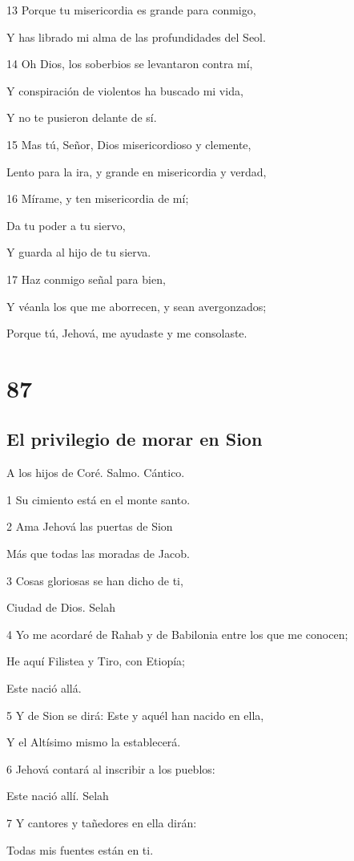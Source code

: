 \par 13 Porque tu misericordia es grande para conmigo,
\par Y has librado mi alma de las profundidades del Seol.
\par 14 Oh Dios, los soberbios se levantaron contra mí,
\par Y conspiración de violentos ha buscado mi vida,
\par Y no te pusieron delante de sí.
\par 15 Mas tú, Señor, Dios misericordioso y clemente,
\par Lento para la ira, y grande en misericordia y verdad,
\par 16 Mírame, y ten misericordia de mí;
\par Da tu poder a tu siervo,
\par Y guarda al hijo de tu sierva.
\par 17 Haz conmigo señal para bien,
\par Y véanla los que me aborrecen, y sean avergonzados;
\par Porque tú, Jehová, me ayudaste y me consolaste.

\chapter{87}

\section*{El privilegio de morar en Sion}

\par A los hijos de Coré. Salmo. Cántico.

\par 1 Su cimiento está en el monte santo.
\par 2 Ama Jehová las puertas de Sion
\par Más que todas las moradas de Jacob.
\par 3 Cosas gloriosas se han dicho de ti,
\par Ciudad de Dios. Selah
\par 4 Yo me acordaré de Rahab y de Babilonia entre los que me conocen;
\par He aquí Filistea y Tiro, con Etiopía;
\par Este nació allá.
\par 5 Y de Sion se dirá: Este y aquél han nacido en ella,
\par Y el Altísimo mismo la establecerá.
\par 6 Jehová contará al inscribir a los pueblos:
\par Este nació allí. Selah
\par 7 Y cantores y tañedores en ella dirán:
\par Todas mis fuentes están en ti.

